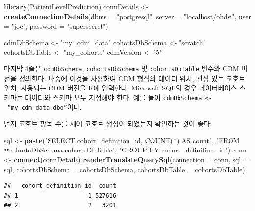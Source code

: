\documentclass[10.5pt]{book}
\newenvironment{Shaded}{\begin{snugshade}}{\end{snugshade}}
\newcommand{\KeywordTok}[1]{\textcolor[rgb]{0.13,0.29,0.53}{\textbf{#1}}}
\newcommand{\DataTypeTok}[1]{\textcolor[rgb]{0.13,0.29,0.53}{#1}}
\newcommand{\StringTok}[1]{\textcolor[rgb]{0.31,0.60,0.02}{#1}}
\newcommand{\NormalTok}[1]{#1}
\theoremstyle{definition}
\theoremstyle{definition}
\theoremstyle{definition}
\theoremstyle{remark}
\begin{document}
\begin{Shaded}
\begin{Highlighting}[]
\KeywordTok{library}\NormalTok{(PatientLevelPrediction)}
\NormalTok{connDetails <-}\StringTok{ }\KeywordTok{createConnectionDetails}\NormalTok{(}\DataTypeTok{dbms =} \StringTok{"postgresql"}\NormalTok{,}
                                       \DataTypeTok{server =} \StringTok{"localhost/ohdsi"}\NormalTok{,}
                                       \DataTypeTok{user =} \StringTok{"joe"}\NormalTok{,}
                                       \DataTypeTok{password =} \StringTok{"supersecret"}\NormalTok{)}

\NormalTok{cdmDbSchema <-}\StringTok{ "my_cdm_data"}
\NormalTok{cohortsDbSchema <-}\StringTok{ "scratch"}
\NormalTok{cohortsDbTable <-}\StringTok{ "my_cohorts"}
\NormalTok{cdmVersion <-}\StringTok{ "5"}
\end{Highlighting}
\end{Shaded}

마지막 4줄은 \texttt{cdmDbSchema}, \texttt{cohortsDbSchema} 및
\texttt{cohortsDbTable} 변수와 CDM 버전을 정의한다. 나중에 이것을
사용하여 CDM 형식의 데이터 위치, 관심 있는 코호트 위치, 사용되는 CDM
버전을 R에 입력한다. Microsoft SQL의 경우 데이터베이스 스키마는 데이터와
스키마 모두 지정해야 한다. 예를 들어
\texttt{cdmDbSchema\ \textless{}-\ “my\_cdm\_data.dbo”}이다.

먼저 코호트 항목 수를 세어 코호트 생성이 되었는지 확인하는 것이 좋다:

\begin{Shaded}
\begin{Highlighting}[]
\NormalTok{sql <-}\StringTok{ }\KeywordTok{paste}\NormalTok{(}\StringTok{"SELECT cohort_definition_id, COUNT(*) AS count"}\NormalTok{,}
\StringTok{"FROM @cohortsDbSchema.cohortsDbTable"}\NormalTok{,}
\StringTok{"GROUP BY cohort_definition_id"}\NormalTok{)}
\NormalTok{conn <-}\StringTok{ }\KeywordTok{connect}\NormalTok{(connDetails)}
\KeywordTok{renderTranslateQuerySql}\NormalTok{(}\DataTypeTok{connection =}\NormalTok{ conn,}
                        \DataTypeTok{sql =}\NormalTok{ sql,}
                        \DataTypeTok{cohortsDbSchema =}\NormalTok{ cohortsDbSchema,}
                        \DataTypeTok{cohortsDbTable =}\NormalTok{ cohortsDbTable)}
\end{Highlighting}
\end{Shaded}

\begin{verbatim}
##   cohort_definition_id  count
## 1                    1 527616
## 2                    2   3201
\end{verbatim}
\end{document}
